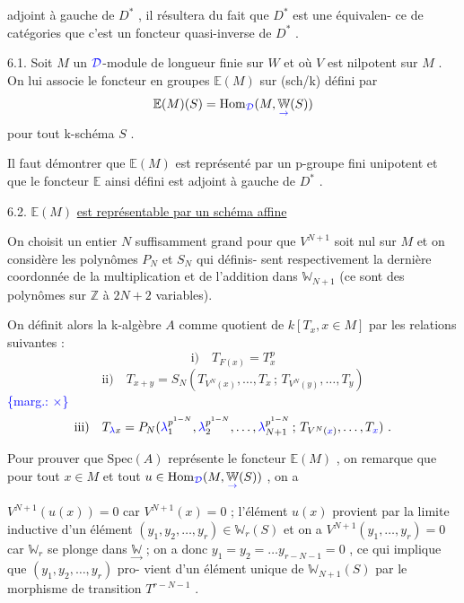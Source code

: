 \documentclass[11pt]{article}
\newcommand{\scanpage}[1]{\par\bigskip\noindent{\small\sffamily[scan #1]}\par}
\newcommand{\mspage}[1]{{\small\sffamily[p.\,#1]}}
\newcommand{\hand}[1]{\textcolor{blue}{#1}}
\newcommand{\margin}[1]{\textcolor{blue}{\{\textsf{marg.:} #1\}}}
\newcommand{\uline}[1]{\underline{#1}}
\begin{document}
adjoint à gauche de $D^*$ , il résultera du fait que $D^*$ est une équivalen-%
ce de catégories que c'est un foncteur quasi-inverse de $D^*$ .

6.1. Soit $M$ un $\hand{\mathcal{D}}$-module de longueur finie sur $W$ et où $V$ est
nilpotent sur $M$ . On lui associe le foncteur en groupes $\mathbb{E}(M)$ sur
(sch/k) défini par
\[ \mathbb{E}(M)(S) = \mathrm{Hom}_{\hand{\mathcal{D}}}(M, \underset{\hand{\to}}{\mathbb{W}}(S)) \]
pour tout k-schéma $S$ .

Il faut démontrer que $\mathbb{E}(M)$ est représenté par un p-groupe
fini unipotent et que le foncteur $\mathbb{E}$ ainsi défini est adjoint à gauche
de $D^*$ .

6.2. $\mathbb{E}(M)$ \uline{est représentable par un schéma affine}

On choisit un entier $N$ suffisamment grand pour que $V^{N+1}$
soit nul sur $M$ et on considère les polynômes $P_N$ et $S_N$ qui définis-%
sent respectivement la dernière coordonnée de la multiplication et de
l'addition dans $\mathbb{W}_{N+1}$ (ce sont des polynômes sur $\mathbb{Z}$ à $2N+2$ variables).

On définit alors la k-algèbre $A$ comme quotient de
$k[T_x, x \in M]$ par les relations suivantes :
\[ \text{i)}\quad T_{F(x)} = T_x^p \]
\[ \text{ii)}\quad T_{x+y} = S_N(T_{V^N(x)}, \ldots, T_x \,;\, T_{V^N(y)}, \ldots, T_y) \]
\margin{$\times$}
\[ \text{iii)}\quad T_{\hand{\lambda}x} = P_N(\hand{\lambda}_1^{p^{1-N}}, \hand{\lambda}_2^{p^{1-N}}, \ldots, \hand{\lambda}_{N+1}^{p^{1-N}} \,;\, T_{V^N(\hand{x})}, \ldots, T_{\hand{x}}) \ . \]

Pour prouver que $\mathrm{Spec}(A)$ représente le foncteur $\mathbb{E}(M)$ ,
on remarque que pour tout $x \in M$ et tout $u \in \mathrm{Hom}_{\hand{\mathcal{D}}}(M, \underset{\hand{\to}}{\mathbb{W}}(S))$ , on a

\mspage{\hand{50}}

\clearpage
\scanpage{129/51}
\mspage{\hand{II 23}}

$V^{N+1}(u(x)) = 0$ car $V^{N+1}(x) = 0$ ; l'élément $u(x)$ provient par la
limite inductive d'un élément $(y_1,y_2,\ldots,y_r) \in \mathbb{W}_r(S)$ et on a
$V^{N+1}(y_1,\ldots,y_r) = 0$ car $\mathbb{W}_r$ se plonge dans $\underset{\rightarrow}{\mathbb{W}}$ ; on a donc
$y_1 = y_2 = \ldots y_{r-N-1} = 0$ , ce qui implique que $(y_1,y_2,\ldots,y_r)$ pro-%
vient d'un élément unique de $\mathbb{W}_{N+1}(S)$ par le morphisme de transition
$T^{r-N-1}$ .
\end{document}
